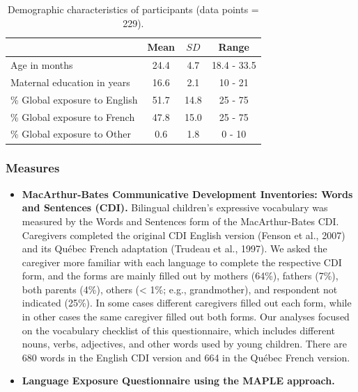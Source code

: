 \documentclass[
  english,
  ,man,floatsintext]{apa6}
\begin{document}
\begin{table}[tbp]

\begin{center}
\begin{threeparttable}

\caption{\label{tab:table4}Demographic characteristics of participants (data points = 229).}

\begin{tabular}{lccc}
\toprule
 & Mean & $SD$ & Range\\
\midrule
Age in months & 24.4 & 4.7 & 18.4 - 33.5\\
Maternal education in years & 16.6 & 2.1 & 10 - 21\\
\% Global exposure to English & 51.7 & 14.8 & 25 - 75\\
\% Global exposure to French & 47.8 & 15.0 & 25 - 75\\
\% Global exposure to Other & 0.6 & 1.8 & 0 - 10\\
\bottomrule
\end{tabular}

\end{threeparttable}
\end{center}

\end{table}

\hypertarget{measures}{%
\subsubsection{Measures}\label{measures}}

\begin{itemize}
\item
  \textbf{MacArthur-Bates Communicative Development Inventories: Words and Sentences (CDI).} Bilingual children's expressive vocabulary was measured by the Words and Sentences form of the MacArthur-Bates CDI. Caregivers completed the original CDI English version (Fenson et al., 2007) and its Québec French adaptation (Trudeau et al., 1997). We asked the caregiver more familiar with each language to complete the respective CDI form, and the forms are mainly filled out by mothers (64\%), fathers (7\%), both parents (4\%), others (\textless{} 1\%; e.g., grandmother), and respondent not indicated (25\%). In some cases different caregivers filled out each form, while in other cases the same caregiver filled out both forms. Our analyses focused on the vocabulary checklist of this questionnaire, which includes different nouns, verbs, adjectives, and other words used by young children. There are 680 words in the English CDI version and 664 in the Québec French version.
\item
  \textbf{Language Exposure Questionnaire using the MAPLE approach.}
\end{itemize}
\end{document}
